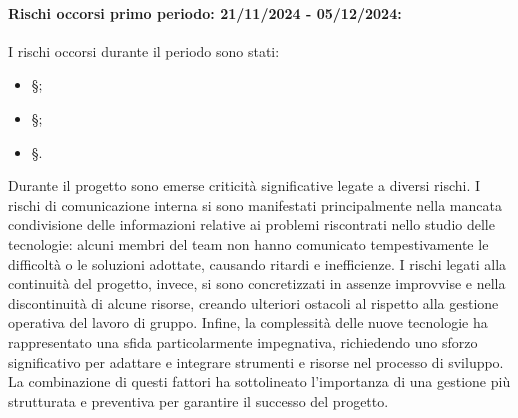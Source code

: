 \paragraph{Rischi occorsi primo periodo: 21/11/2024 - 05/12/2024: }
I rischi occorsi durante il periodo sono stati:
\begin{itemize}
    \item \S{};
    \item \S{};
    \item \S{}.
\end{itemize}Durante il progetto sono emerse criticità significative legate a diversi rischi. I rischi di comunicazione interna si sono manifestati principalmente nella mancata condivisione delle informazioni relative ai problemi riscontrati nello studio delle tecnologie: alcuni membri del team non hanno comunicato tempestivamente le difficoltà o le soluzioni adottate, causando ritardi e inefficienze.
I rischi legati alla continuità del progetto, invece, si sono concretizzati in assenze improvvise e nella discontinuità di alcune risorse, creando ulteriori ostacoli al rispetto alla gestione operativa del lavoro di gruppo.
Infine, la complessità delle nuove tecnologie ha rappresentato una sfida particolarmente impegnativa, richiedendo uno sforzo significativo per adattare e integrare strumenti e risorse nel processo di sviluppo. La combinazione di questi fattori ha sottolineato l'importanza di una gestione più strutturata e preventiva per garantire il successo del progetto.

\newpage
